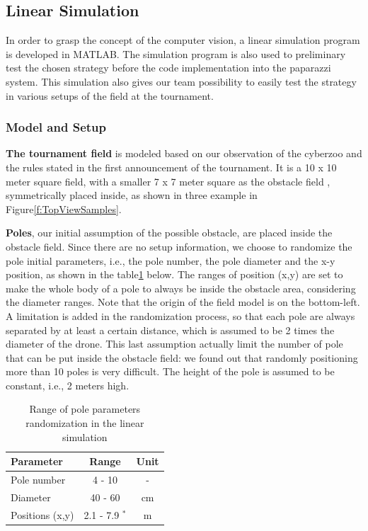 \subsection{Linear Simulation}
\label{subsec:lin_sim}

In order to grasp the concept of the computer vision, a linear simulation program is developed in MATLAB. The simulation program is also used to preliminary test the chosen strategy before the code implementation into the paparazzi system. This simulation also gives our team possibility to easily test the strategy in various setups of the field at the tournament. 

\subsubsection{Model and Setup}
\textbf{The tournament field} is modeled based on our observation of the cyberzoo and the rules stated in the first announcement of the tournament. It is a 10 x 10 meter square field, with a smaller 7 x 7 meter square as the obstacle field , symmetrically placed inside, as shown in three example in Figure\ref{f:TopViewSamples}.

\textbf{Poles}, our initial assumption of the possible obstacle, are placed inside the obstacle field. Since there are no setup information, we choose to randomize the pole initial parameters, i.e., the pole number, the pole diameter and the x-y position, as shown in the table\ref{t:RandomPole} below. The ranges of position (x,y) are set to make the whole body of a pole to always be inside the obstacle area, considering the diameter ranges. Note that the origin of the field model is on the bottom-left. A limitation is added in the randomization process, so that each pole are always separated by at least a certain distance, which is assumed to be 2 times the diameter of the drone. This last assumption actually limit the number of pole that can be put inside the obstacle field: we found out that randomly positioning more than 10 poles is very difficult. The height of the pole is assumed  to be constant, i.e., 2 meters high. 

\begin{table}
\caption{Range of pole parameters randomization in the linear simulation}
\label{t:RandomPole}
\begin{center}
\begin{tabular}{lcc}
\hline \hline
Parameter & Range & Unit \\\hline
Pole number & 4 - 10 & - \\
Diameter & 40 - 60 & cm \\
Positions (x,y) & 2.1 - 7.9 $^*$ & m \\\hline\hline
\end{tabular}
\end{center}

\end{table}

